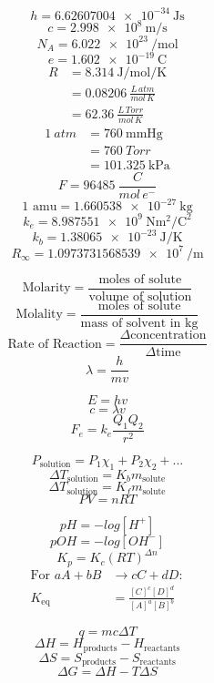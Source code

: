 $$h = \SI{6.62607004e-34}{\joule\second}$$
$$c = \SI{2.998e8}{\meter\per\second}$$
$$N_A = \SI{6.022e23}{\per\mol}$$
$$e = \SI{1.602e-19}{\coulomb}$$
\begin{equation*}
\begin{split}
R & = \SI[per-mode=fraction]{8.314}{\joule\per\mol\per\kelvin} \\
& = \SI{0.08206}{\frac{L\,atm}{mol\,K}} \\
& = \SI{62.36}{\frac{L\,Torr}{mol\,K}}
\end{split}
\end{equation*}
\begin{equation*}
\begin{split}
\SI{1}{atm} & = \SI{760}{\mmHg} \\
& = \SI{760}{Torr} \\
& = \SI{101.325}{\kPa}
\end{split}
\end{equation*}
$$F = \SI{96485}{\frac{C}{mol\,e^-}}$$
$$\textrm{1 amu} = \SI{1.660538e-27}{\kg}$$
$$k_e = \SI{8.987551e9}{\newton\meter\squared\per\coulomb\squared}$$
$$k_b = \SI{1.38065e-23}{\joule\per\kelvin}$$
$$R_\infty = \SI{1.0973731568539e7}{\per\meter}$$

$$\textrm{Molarity} = \frac{\textrm{moles of solute}}{\textrm{volume of solution}}$$
$$\textrm{Molality} = \frac{\textrm{moles of solute}}{\textrm{mass of solvent in kg}}$$
$$\textrm{Rate of Reaction} = \frac{\Delta \textrm{concentration}}{\Delta \textrm{time}}$$
$$\lambda = \frac{h}{mv}$$

$$E = hv$$
$$c = \lambda v$$
$$F_e = k_e \frac{Q_1 Q_2}{r^2}$$

$$P_\textrm{solution} = P_1 \chi_1 + P_2 \chi_2 + ...$$
$$\Delta T_\textrm{solution} = K_b m_\textrm{solute}$$
$$\Delta T_\textrm{solution} = K_f m_\textrm{solute}$$
$$PV = nRT$$

$$pH = -log[H^+]$$
$$pOH = -log[OH^-]$$
$$K_p = K_c(RT)^{\Delta n}$$
\begin{equation*}
\begin{split}
\textrm{For }aA + bB &\rightarrow cC + dD\colon \\
K_{\textrm{eq}} &= \frac{[C]^c [D]^d}{[A]^a [B]^b}
\end{split}
\end{equation*}

$$q = mc\Delta T$$
$$\Delta H = H_{\textrm{products}} - H_{\textrm{reactants}}$$
$$\Delta S = S_{\textrm{products}} - S_{\textrm{reactants}}$$
$$\Delta G = \Delta H - T\Delta S$$